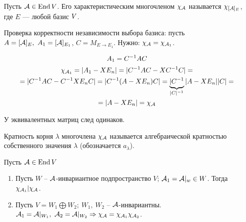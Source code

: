 \documentclass[main]{subfiles}
\begin{document}
\begin{definition}
    Пусть $\mathcal{A} \in \operatorname{End} V$. Его характеристическим многочленом $\chi_{\mathcal{A}}$ называется
    $\chi_{[\mathcal{A}]_E}$, где $E$  — любой базис $V$.
\end{definition}

Проверка корректности независимости выбора базиса: пусть $A = [\mathcal{A}]_E,\ A_1 = [\mathcal{A}]_{E_1}$,
$C = M_{E \rightarrow E_1}$. Нужно: $\chi_{\mathcal{A}} = \chi_{\mathcal{A}_1}$.

\[A_1 = C^{-1}A C\]
\begin{multline*}
    \chi_{\mathcal{A}_1} = |A_1 - X E_n| =
    |C^{-1}A C - XC^{-1}C| = \\ = |C^{-1}A C - C^{-1}XE_nC| =
    |C^{-1}(A - XE_n) C| = \underbrace{|C^{-1}}_{|C|^{-1}}|A - XE_n||C| = \\ =
    |A - XE_n| = \chi_{\mathcal{A}}
\end{multline*}

У эквивалентных матриц след одинаков.


\begin{definition} 
    Кратность корня $\lambda$ многочлена $\chi_{\mathcal{A}}$ называется алгебраической кратностью собственного значения $\lambda$ (обозначается $a_{\lambda}$).
\end{definition}

\begin{proposition}
    Пусть $\mathcal{A} \in \operatorname{End} V$
    \begin{enumerate}
        \item Пусть $W$ -- ${\mathcal{A}}$-инвариантное подпространство $V$; $\mathcal{A}_1 = \mathcal{A}|_w \in W$. Тогда $\chi_{\mathcal{A}_1} | \chi_{\mathcal{A}}$.
        \item Пусть $V = W_1 \bigoplus W_2;\ W_1,\ W_2$ -- $\mathcal{A}$-инвариантны. $\mathcal{A}_1 = \mathcal{A}|_{W_1},\ \mathcal{A}_2 = \mathcal{A}|_{W_2} \Rightarrow
                  \chi_{\mathcal{A}} = \chi_{\mathcal{A}_1}\chi_{\mathcal{A}_2}$.
    \end{enumerate}

\end{proposition}
\end{document}
